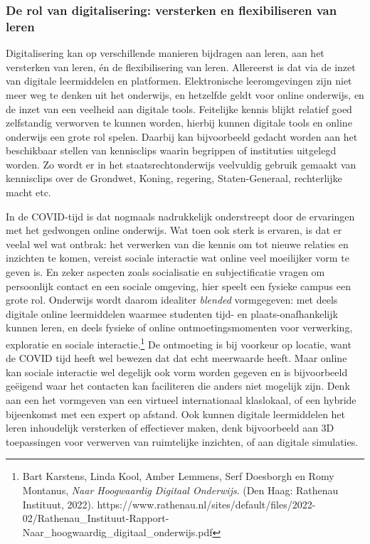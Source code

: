 \documentclass[smallauthor, chapterhaspagenum, nochapterinheader, pagenuminheader,  bigchapnum,medium2, tocpages,  garamond, titleinheader]{jote-book}
\begin{document}
	\subsubsection{De rol van digitalisering: versterken en flexibiliseren van leren}



	Digitalisering kan op verschillende manieren bijdragen aan leren, aan het versterken van leren, én de flexibilisering van leren. Allereerst is dat via de inzet van digitale leermiddelen en platformen. Elektronische leeromgevingen zijn niet meer weg te denken uit het onderwijs, en hetzelfde geldt voor online onderwijs, en de inzet van een veelheid aan digitale tools. Feitelijke kennis blijkt relatief goed zelfstandig verworven te kunnen worden, hierbij kunnen digitale tools en online onderwijs een grote rol spelen. Daarbij kan bijvoorbeeld gedacht worden aan het beschikbaar stellen van kennisclips waarin begrippen of instituties uitgelegd worden. Zo wordt er in het staatsrechtonderwijs veelvuldig gebruik gemaakt van kennisclips over de Grondwet, Koning, regering, Staten-Generaal, rechterlijke macht etc.



	In de COVID-tijd is dat nogmaals nadrukkelijk onderstreept door de ervaringen met het gedwongen online onderwijs. Wat toen ook sterk is ervaren, is dat er veelal wel wat ontbrak: het verwerken van die kennis om tot nieuwe relaties en inzichten te komen, vereist sociale interactie wat online veel moeilijker vorm te geven is. En zeker aspecten zoals socialisatie en subjectificatie vragen om persoonlijk contact en een sociale omgeving, hier speelt een fysieke campus een grote rol. Onderwijs wordt daarom idealiter \emph{blended} vormgegeven: met deels digitale online leermiddelen waarmee studenten tijd- en plaats-onafhankelijk kunnen leren, en deels fysieke of online ontmoetingsmomenten voor verwerking, exploratie en sociale interactie.\footnote{Bart Karstens, Linda Kool, Amber Lemmens, Serf Doesborgh en Romy Montanus, \emph{Naar Hoogwaardig Digitaal Onderwijs}. (Den Haag: Rathenau Instituut, 2022). https://www.rathenau.nl/sites/default/files/2022-02/Rathenau\_Instituut-Rapport-Naar\_hoogwaardig\_digitaal\_onderwijs.pdf} De ontmoeting is bij voorkeur op locatie, want de COVID tijd heeft wel bewezen dat dat echt meerwaarde heeft. Maar online kan sociale interactie wel degelijk ook vorm worden gegeven en is bijvoorbeeld geëigend waar het contacten kan faciliteren die anders niet mogelijk zijn. Denk aan een het vormgeven van een virtueel internationaal klaslokaal, of een hybride bijeenkomst met een expert op afstand. Ook kunnen digitale leermiddelen het leren inhoudelijk versterken of effectiever maken, denk bijvoorbeeld aan 3D toepassingen voor verwerven van ruimtelijke inzichten, of aan digitale simulaties.
\end{document}
